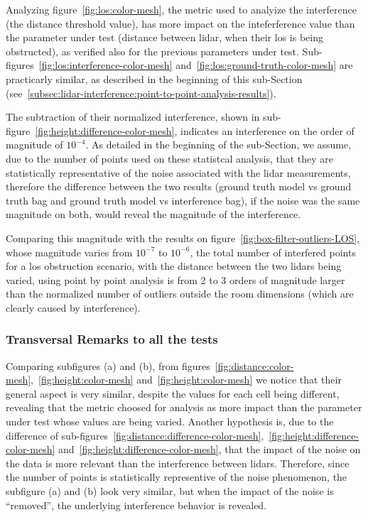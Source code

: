 Analyzing figure~\ref{fig:los:color-mesh}, the metric used to analyize the interference (the distance threshold value), has more impact on the inteferference value than the parameter under test (distance between \ac{lidar}, when their \ac{los} is being obstructed), as verified also for the previous parameters under test. Sub-figures~\ref{fig:los:interference-color-mesh} and~\ref{fig:los:ground-truth-color-mesh} are practicarly similar, as described in the beginning of this sub-Section (see~\ref{subsec:lidar-interference:point-to-point-analysis-results}).

The subtraction of their normalized interference, shown in sub-figure~\ref{fig:height:difference-color-mesh}, indicates an interference on the order of magnitude of $10^{-4}$. As detailed in the beginning of the sub-Section, we assume, due to the number of points used on these statistcal analysis, that they are statistically representative of the noise associated with the \ac{lidar} measurements, therefore the difference between the two results (ground truth model vs ground truth bag and ground truth model vs interference bag), if the noise was the same magnitude on both, would reveal the magnitude of the interference. 

Comparing this magnitude with the results on figure~\ref{fig:box-filter-outliers-LOS}, whose magnitude varies from $10^{-7}$ to $10^{-6}$, the total number of interfered points for a \ac{los} obstruction scenario, with the distance between the two \acp{lidar} being varied, using point by point analysis is from 2 to 3 orders of magnitude larger than the normalized number of outliers outside the room dimensions (which are clearly caused by interference).


\subsubsection{Transversal Remarks to all the tests}
Comparing subfigures (a) and (b), from figures~\ref{fig:distance:color-mesh},~\ref{fig:height:color-mesh} and~\ref{fig:height:color-mesh} we notice that their general aspect is very similar, despite the values for each cell being different, revealing that the metric choosed for analysis as more impact than the parameter under test whose values are being varied. Another hypothesis is, due to the difference of sub-figures~\ref{fig:distance:difference-color-mesh},~\ref{fig:height:difference-color-mesh} and~\ref{fig:height:difference-color-mesh}, that the impact of the noise on the data is more relevant than the interference between \acp{lidar}. Therefore, since the number of points is statistically representive of the noise phenomenon, the subfigure (a) and (b) look very similar, but when the impact of the noise is ``removed'', the underlying interference behavior is revealed. 

